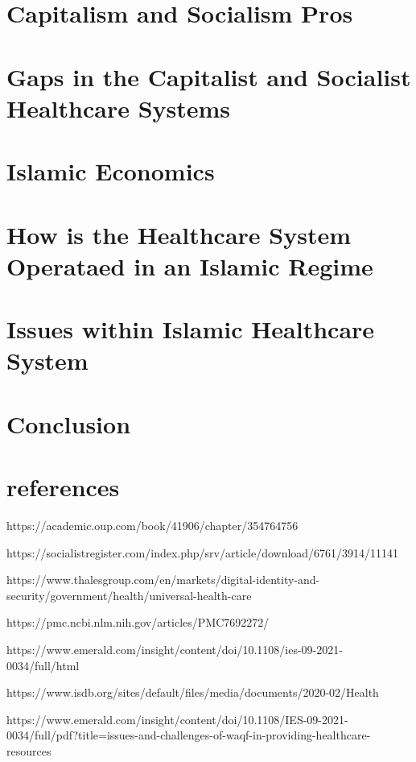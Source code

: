 \documentclass[conference]{IEEEtran}
\begin{document}
\section{Capitalism and Socialism Pros}


\section{Gaps in the Capitalist and Socialist Healthcare Systems}


\section{Islamic Economics}


\section{How is the Healthcare System Operataed in an Islamic Regime}



\section{Issues within Islamic Healthcare System}


\section{Conclusion}

\section{references}
\par
[1] https://academic.oup.com/book/41906/chapter/354764756

\par
[2] https://socialistregister.com/index.php/srv/article/download/6761/3914/11141

\par
[3] https://www.thalesgroup.com/en/markets/digital-identity-and-security/government/health/universal-health-care

\par
[4] https://pmc.ncbi.nlm.nih.gov/articles/PMC7692272/

\par
[5] https://www.emerald.com/insight/content/doi/10.1108/ies-09-2021-0034/full/html

\par
[6] https://www.isdb.org/sites/default/files/media/documents/2020-02/Health%

\par
[7] https://www.emerald.com/insight/content/doi/10.1108/IES-09-2021-0034/full/pdf?title=issues-and-challenges-of-waqf-in-providing-healthcare-resources





\end{document}
